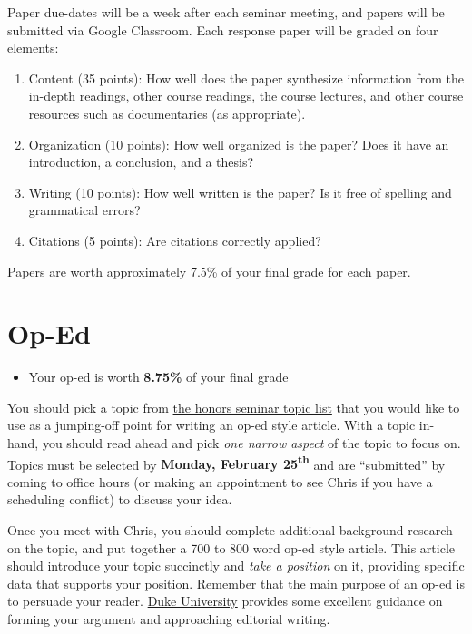 \documentclass[]{book}
\providecommand{\tightlist}{%
  \setlength{\itemsep}{0pt}\setlength{\parskip}{0pt}}
\newenvironment{rmdblock}[1]
  {\begin{shaded*}
  \begin{itemize}
  \renewcommand{\labelitemi}{
    \raisebox{-.7\height}[0pt][0pt]{
      {\setkeys{Gin}{width=3em,keepaspectratio}\texttt{[image: images/\#1]}}
    }
  }
  \item
  }
  {
  \end{itemize}
  \end{shaded*}
  }
\newenvironment{rmdtip}
  {\begin{rmdblock}{tip}}
  {\end{rmdblock}}
\begin{document}
Paper due-dates will be a week after each seminar meeting, and papers will be submitted via Google Classroom. Each response paper will be graded on four elements:

\begin{enumerate}
\def\labelenumi{\arabic{enumi}.}
\tightlist
\item
  Content (35 points): How well does the paper synthesize information from the in-depth readings, other course readings, the course lectures, and other course resources such as documentaries (as appropriate).
\item
  Organization (10 points): How well organized is the paper? Does it have an introduction, a conclusion, and a thesis?
\item
  Writing (10 points): How well written is the paper? Is it free of spelling and grammatical errors?
\item
  Citations (5 points): Are citations correctly applied?
\end{enumerate}

Papers are worth approximately 7.5\% of your final grade for each paper.

\hypertarget{op-ed}{%
\section{Op-Ed}\label{op-ed}}

\begin{rmdtip}
Your op-ed is worth \textbf{8.75\%} of your final grade
\end{rmdtip}

You should pick a topic from \href{/honors-seminar-topics.html}{the honors seminar topic list} that you would like to use as a jumping-off point for writing an op-ed style article. With a topic in-hand, you should read ahead and pick \emph{one narrow aspect} of the topic to focus on. Topics must be selected by \textbf{Monday, February 25\textsuperscript{th}} and are ``submitted'' by coming to office hours (or making an appointment to see Chris if you have a scheduling conflict) to discuss your idea.

Once you meet with Chris, you should complete additional background research on the topic, and put together a 700 to 800 word op-ed style article. This article should introduce your topic succinctly and \emph{take a position} on it, providing specific data that supports your position. Remember that the main purpose of an op-ed is to persuade your reader. \href{https://styleguide.duke.edu/toolkits/writing-media/how-to-write-an-op-ed-article/}{Duke University} provides some excellent guidance on forming your argument and approaching editorial writing.
\end{document}
